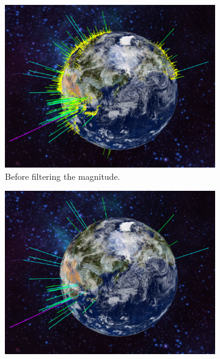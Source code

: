 
\begin{figure}[H]
	\captionsetup[subfigure]{aboveskip=8pt,belowskip=8pt}
	\newcommand{\figurewidth}{0.5\textwidth}
	\begin{subfigure}[b]{\figurewidth}
		\includegraphics[width=\textwidth]{images/implementation/filtering/magnitude_before}
		\caption{Before filtering the magnitude.}
		\label{fig:before_filtering_magnitude}
	\end{subfigure}
	\begin{subfigure}[b]{\figurewidth}
		\includegraphics[width=\textwidth]{images/implementation/filtering/magnitude_after}

\end{subfigure}
\end{figure}
